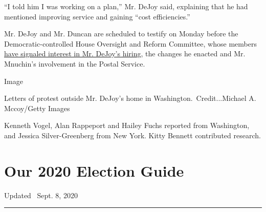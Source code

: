 ``I told him I was working on a plan,'' Mr. DeJoy said, explaining that
he had mentioned improving service and gaining ``cost efficiencies.''

Mr. DeJoy and Mr. Duncan are scheduled to testify on Monday before the
Democratic-controlled House Oversight and Reform Committee, whose
members
\href{https://www.documentcloud.org/documents/7042332-Concerns-About-DeJoy-Were-Ignored-Democrats.html}{have
signaled interest in Mr. DeJoy's hiring}, the changes he enacted and Mr.
Mnuchin's involvement in the Postal Service.

Image

Letters of protest outside Mr. DeJoy's home in
Washington.~Credit...Michael A. Mccoy/Getty Images

Kenneth Vogel, Alan Rappeport and Hailey Fuchs reported from Washington,
and Jessica Silver-Greenberg from New York. Kitty Bennett contributed
research.

\hypertarget{our-2020-election-guide}{%
\section{Our 2020 Election Guide}\label{our-2020-election-guide}}

Updated ~Sept. 8, 2020

\begin{center}\rule{0.5\linewidth}{\linethickness}\end{center}

